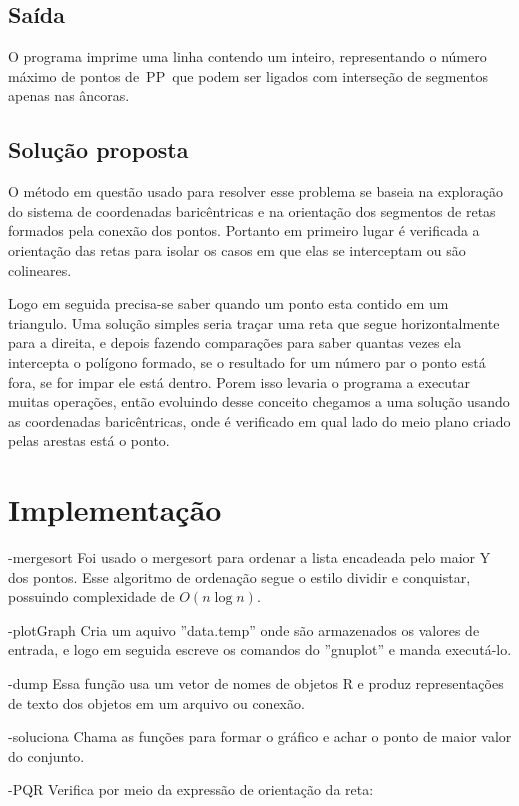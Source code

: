 \documentclass[12pt,a4paper]{article}
\begin{document}
\subsection{Saída}

O programa imprime uma linha contendo um inteiro, representando o número máximo de pontos de PP que podem ser ligados com interseção de segmentos apenas nas âncoras.

\subsection{Solução proposta}

O método em questão usado para resolver esse problema se baseia na exploração do sistema de coordenadas baricêntricas e na orientação dos segmentos de retas formados pela conexão dos pontos. Portanto em primeiro lugar é verificada a orientação das retas para isolar os casos em que elas se interceptam ou são colineares.

Logo em seguida precisa-se saber quando um ponto esta contido em um triangulo. Uma solução simples seria traçar uma reta que segue horizontalmente para a direita, e depois fazendo comparações para saber quantas vezes ela intercepta o polígono formado, se o resultado for um número par o ponto está fora, se for impar ele está dentro. Porem isso levaria o programa a executar muitas operações, então evoluindo desse conceito chegamos a uma solução usando as coordenadas baricêntricas, onde é verificado em qual lado do meio plano criado pelas arestas está o ponto.


\section{Implementação}

-mergesort
Foi usado o mergesort para ordenar a lista encadeada pelo maior Y dos pontos. Esse algoritmo de ordenação segue o estilo dividir e conquistar, possuindo complexidade de $O(n \log n)$.

-plotGraph
Cria um aquivo ''data.temp'' onde são armazenados os valores de entrada, e logo em seguida escreve os comandos do ''gnuplot'' e manda executá-lo.

-dump 
Essa função usa um vetor de nomes de objetos R e produz representações de texto dos objetos em um arquivo ou conexão.

-soluciona
Chama as funções para formar o gráfico e achar o ponto de maior valor do conjunto.

-PQR
Verifica por meio da expressão de orientação da reta:
\end{document}
